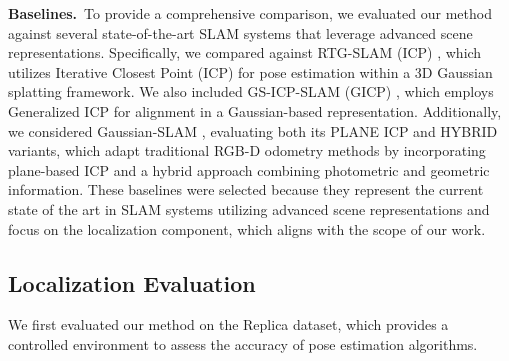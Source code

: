 \documentclass[twocolumn]{article} %
\begin{document}
\textbf{Baselines.}~To provide a comprehensive comparison, we evaluated
our method against several state-of-the-art SLAM systems that leverage
advanced scene representations. Specifically, we compared against
RTG-SLAM (ICP) \cite{pengRTGSLAMRealtime3D2024}, which utilizes
Iterative Closest Point (ICP) for pose estimation within a 3D Gaussian
splatting framework. We also included GS-ICP-SLAM (GICP)
\cite{haRGBDGSICPSLAM2024}, which employs Generalized ICP for
alignment in a Gaussian-based representation. Additionally, we
considered Gaussian-SLAM
\cite{yugayGaussianSLAMPhotorealisticDense2024}, evaluating both its
PLANE ICP and HYBRID variants, which adapt traditional RGB-D odometry
methods by incorporating plane-based ICP and a hybrid approach combining
photometric and geometric information. These baselines were selected
because they represent the current state of the art in SLAM systems
utilizing advanced scene representations and focus on the localization
component, which aligns with the scope of our work.

\subsection{Localization Evaluation}\label{localization-evaluation}

We first evaluated our method on the Replica dataset, which provides a
controlled environment to assess the accuracy of pose estimation
algorithms.
\end{document}
